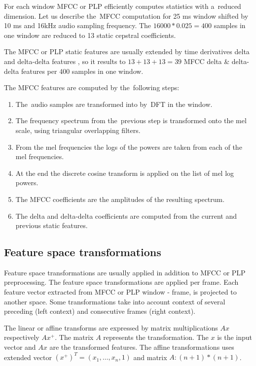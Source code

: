 For each window \ac{MFCC} or \ac{PLP} efficiently computes statistics with a~reduced dimension. 
Let us describe the~\ac{MFCC} computation for 25 ms window shifted by 10 ms and 16kHz audio sampling frequency. 
The $16000 * 0.025 = 400$ samples in one window are reduced to 13 static cepstral coefficients.

The \ac{MFCC} or \ac{PLP} static features are usually extended 
by time derivatives delta and delta-delta features \cite{psutka2001comparison},
so it results to $13 + 13 + 13 = 39$ \ac{MFCC} delta \& delta-delta features 
per 400 samples in one window.

The \ac{MFCC} features are computed by the~following steps:

\small{\begin{enumerate}
    \item The~audio samples are transformed into  by~\ac{DFT} in the window.
    \item The frequency spectrum from the~previous step is transformed onto the mel scale, 
        using triangular overlapping filters.
    \item From the mel frequencies the logs of the powers are taken from each of the mel frequencies.
    \item At the end the discrete cosine transform is applied on the list of mel log powers.
    \item The \ac{MFCC} coefficients are the amplitudes of the resulting spectrum.
    \item The delta and delta-delta coefficients are computed from the current and previous static features.
\end{enumerate}

\subsection*{Feature space transformations}
Feature space transformations are usually applied in addition to \ac{MFCC} or \ac{PLP} preprocessing.
The feature space transformations are applied per frame. 
Each feature vector extracted from \ac{MFCC}
or \ac{PLP} window - frame, is projected to another space.
Some transformations take into account context of several 
preceding (left context) and consecutive frames (right context).

The linear or affine transforms are expressed by matrix multiplications $Ax$ respectively $Ax^+$.
The matrix $A$ represents the transformation. 
The $x$ is the input vector and $Ax$ are the transformed features.
The affine transformations uses extended vector $(x^+)^T = (x_1, \ldots, x_n, 1)$ and matrix $A: (n+1)*(n+1)$.

}
